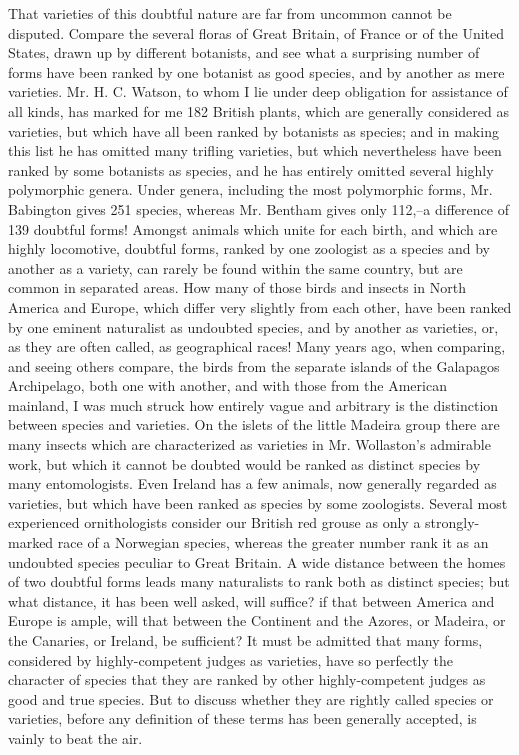 That varieties of this doubtful nature are far from uncommon cannot be disputed. Compare the several floras of Great Britain, of France or of the United States, drawn up by different botanists, and see what a surprising number of forms have been ranked by one botanist as good species, and by another as mere varieties. Mr. H. C. Watson, to whom I lie under deep obligation for assistance of all kinds, has marked for me 182 British plants, which are generally considered as varieties, but which have all been ranked by botanists as species; and in making this list he has omitted many trifling varieties, but which nevertheless have been ranked by some botanists as species, and he has entirely omitted several highly polymorphic genera. Under genera, including the most polymorphic forms, Mr. Babington gives 251 species, whereas Mr. Bentham gives only 112,--a difference of 139 doubtful forms! Amongst animals which unite for each birth, and which are highly locomotive, doubtful forms, ranked by one zoologist as a species and by another as a variety, can rarely be found within the same country, but are common in separated areas. How many of those birds and insects in North America and Europe, which differ very slightly from each other, have been ranked by one eminent naturalist as undoubted species, and by another as varieties, or, as they are often called, as geographical races! Many years ago, when comparing, and seeing others compare, the birds from the separate islands of the Galapagos Archipelago, both one with another, and with those from the American mainland, I was much struck how entirely vague and arbitrary is the distinction between species and varieties. On the islets of the little Madeira group there are many insects which are characterized as varieties in Mr. Wollaston's admirable work, but which it cannot be doubted would be ranked as distinct species by many entomologists. Even Ireland has a few animals, now generally regarded as varieties, but which have been ranked as species by some zoologists. Several most experienced ornithologists consider our British red grouse as only a strongly-marked race of a Norwegian species, whereas the greater number rank it as an undoubted species peculiar to Great Britain. A wide distance between the homes of two doubtful forms leads many naturalists to rank both as distinct species; but what distance, it has been well asked, will suffice? if that between America and Europe is ample, will that between the Continent and the Azores, or Madeira, or the Canaries, or Ireland, be sufficient? It must be admitted that many forms, considered by highly-competent judges as varieties, have so perfectly the character of species that they are ranked by other highly-competent judges as good and true species. But to discuss whether they are rightly called species or varieties, before any definition of these terms has been generally accepted, is vainly to beat the air.
